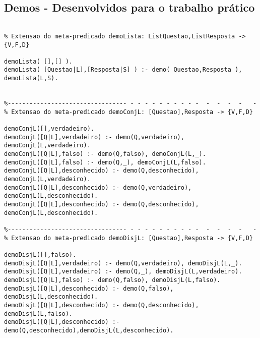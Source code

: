 \documentclass{report}
\begin{document}
\subsection{Demos - Desenvolvidos para o trabalho prático}

\begin{verbatim}

% Extensao do meta-predicado demoLista: ListQuestao,ListResposta -> {V,F,D}

demoLista( [],[] ).
demoLista( [Questao|L],[Resposta|S] ) :- demo( Questao,Resposta ), demoLista(L,S).


%--------------------------------- - - - - - - - - - -  -  -  -  -   -
% Extensao do meta-predicado demoConjL: [Questao],Resposta -> {V,F,D}

demoConjL([],verdadeiro).
demoConjL([Q|L],verdadeiro) :- demo(Q,verdadeiro), demoConjL(L,verdadeiro).
demoConjL([Q|L],falso) :- demo(Q,falso), demoConjL(L,_).
demoConjL([Q|L],falso) :- demo(Q,_), demoConjL(L,falso).
demoConjL([Q|L],desconhecido) :- demo(Q,desconhecido), demoConjL(L,verdadeiro).
demoConjL([Q|L],desconhecido) :- demo(Q,verdadeiro), demoConjL(L,desconhecido).
demoConjL([Q|L],desconhecido) :- demo(Q,desconhecido), demoConjL(L,desconhecido).

%--------------------------------- - - - - - - - - - -  -  -  -  -   -
% Extensao do meta-predicado demoDisjL: [Questao],Resposta -> {V,F,D}

demoDisjL([],falso).
demoDisjL([Q|L],verdadeiro) :- demo(Q,verdadeiro), demoDisjL(L,_).
demoDisjL([Q|L],verdadeiro) :- demo(Q,_), demoDisjL(L,verdadeiro).
demoDisjL([Q|L],falso) :- demo(Q,falso), demoDisjL(L,falso).
demoDisjL([Q|L],desconhecido) :- demo(Q,falso), demoDisjL(L,desconhecido).
demoDisjL([Q|L],desconhecido) :- demo(Q,desconhecido), demoDisjL(L,falso).
demoDisjL([Q|L],desconhecido) :- demo(Q,desconhecido),demoDisjL(L,desconhecido).
\end{verbatim}
\end{document}
